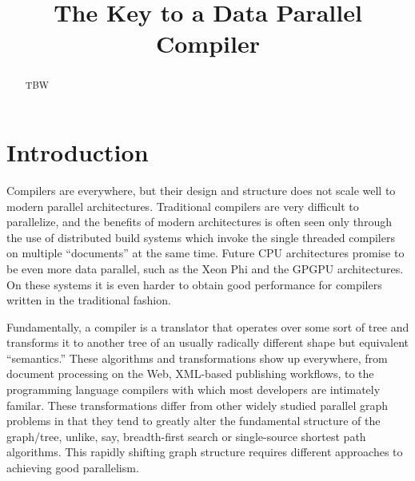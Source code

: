 \documentclass[pldi]{sigplanconf-pldi15}
\begin{document}
\title{The Key to a Data Parallel Compiler}

\maketitle
\begin{abstract}
TBW
\end{abstract}


\section{Introduction}

Compilers are everywhere, but their design and structure does not scale well to modern 
parallel architectures. Traditional compilers are very difficult to parallelize, and the benefits of 
modern architectures is often seen only through the use of distributed build systems which invoke 
the single threaded compilers on multiple ``documents'' at the same time. Future CPU architectures 
promise to be even more data parallel, such as the Xeon Phi and the GPGPU architectures. On these 
systems it is even harder to obtain good performance for compilers written in the traditional fashion. 

Fundamentally, a compiler is a translator that operates over some sort of tree and transforms it to 
another tree of an usually radically different shape but equivalent ``semantics.'' These algorithms and 
transformations show up everywhere, from document processing on the Web, XML-based publishing 
workflows, to the programming language compilers with which most developers are intimately familar. 
These transformations differ from other widely studied parallel graph problems in that they tend to greatly 
alter the fundamental structure of the graph/tree, unlike, say, breadth-first search or single-source 
shortest path algorithms. This rapidly shifting graph structure requires different approaches to 
achieving good parallelism. 
\end{document}
